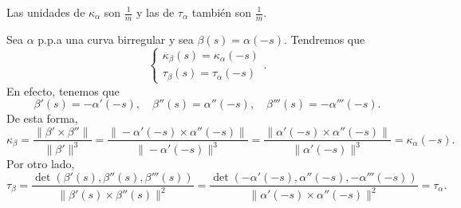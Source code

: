 \begin{observation}[Unidades]
	Las unidades de $\displaystyle \kappa_{\alpha } $ son $\displaystyle \frac{1}{m} $ y las de $\displaystyle \tau_{\alpha } $ también son $\displaystyle \frac{1}{m} $.  
\end{observation}

\begin{observation}
Sea $\displaystyle \alpha  $ p.p.a una curva birregular y sea $\displaystyle \beta\left(s\right)=\alpha\left(-s\right) $. Tendremos que 
\[
\begin{cases}
\kappa_{\beta }\left(s\right)=\kappa_{\alpha }\left(-s\right) \\
\tau_{\beta }\left(s\right)=\tau_{\alpha }\left(-s\right)
\end{cases}
.\]
En efecto, tenemos que 
\[\beta'\left(s\right)=-\alpha'\left(-s\right), \quad \beta''\left(s\right)=\alpha''\left(-s\right) , \quad \beta'''\left(s\right)=-\alpha'''\left(-s\right).\]
De esta forma, 
\[\kappa_{\beta }= \frac{\|\beta' \times \beta''\|}{\|\beta'\|^{3}}=\frac{\|-\alpha'\left(-s\right)\times\alpha''\left(-s\right)\|}{\|-\alpha'\left(-s\right)\|^{3}} = \frac{\|\alpha'\left(-s\right) \times \alpha''\left(-s\right)\|}{\|\alpha'\left(-s\right)\|^{3}}=\kappa_{\alpha }\left(-s\right) .\]
Por otro lado, 
\[\tau_{\beta }=\frac{\det\left(\beta'\left(s\right), \beta''\left(s\right), \beta'''\left(s\right)\right)}{\|\beta'\left(s\right)\times\beta''\left(s\right)\|^{2}} = \frac{\det\left(-\alpha'\left(-s\right), \alpha''\left(-s\right), -\alpha'''\left(-s\right)\right)}{\|\alpha'\left(-s\right)\times\alpha''\left(-s\right)\|^{2}}=\tau_{\alpha } .\]
\end{observation}

